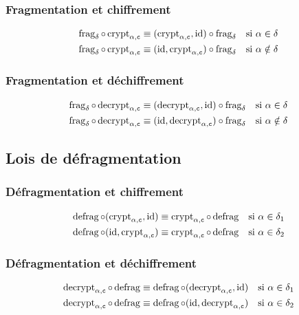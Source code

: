 \subsubsection*{Fragmentation et chiffrement}
\begin{align*}
\fragDelta \circ \cryptCAlpha
& \equiv (\cryptCAlpha, \id) \circ\fragDelta 
& \text{si $\alpha \in \delta$}\\
\fragDelta \circ \cryptCAlpha
& \equiv (\id, \cryptCAlpha) \circ\fragDelta 
& \text{si $\alpha \notin \delta$}
\end{align*}
\subsubsection*{Fragmentation et déchiffrement}
\begin{align*}
\fragDelta \circ \decryptCAlpha
& \equiv (\decryptCAlpha, \id) \circ \fragDelta
& \text{si $\alpha \in \delta$} \\
\fragDelta \circ \decryptCAlpha
& \equiv (\id, \decryptCAlpha) \circ \fragDelta
& \text{si $\alpha \notin \delta$}
\end{align*}

\subsection*{Lois de défragmentation}
\subsubsection*{Défragmentation et chiffrement}
\args
\begin{align*}
\defrag \circ (\cryptCAlpha, \id)
& \equiv \cryptCAlpha \circ \defrag 
& \text{si $\alpha \in \delta_1$} \\
\defrag \circ (\id, \cryptCAlpha)
& \equiv \cryptCAlpha \circ \defrag 
& \text{si $\alpha \in \delta_2$} 
\end{align*}

\subsubsection*{Défragmentation et déchiffrement}
\args
\begin{align*}
\decryptCAlpha \circ \defrag 
& \equiv \defrag \circ (\decryptCAlpha, \id)
& \text{si $\alpha \in \delta_1$} \\
\decryptCAlpha \circ \defrag 
& \equiv \defrag \circ (\id, \decryptCAlpha)
& \text{si $\alpha \in \delta_2$}
\end{align*}

